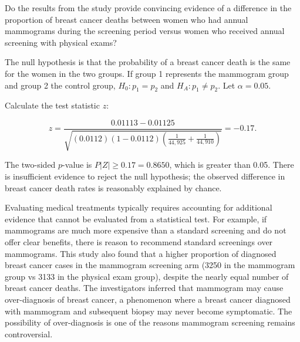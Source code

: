 \begin{example}{Do the results from the study provide convincing evidence of a difference in the proportion of breast cancer deaths between women who had annual mammograms during the screening period versus women who received annual screening with physical exams?}

\label{mammogramExProp}

The null hypothesis is that the probability of a breast cancer death is the same for the women in the two groups. If group 1 represents the mammogram group and group 2 the control group, $H_0: p_1 = p_2$ and $H_A: p_1 \neq p_2$.  Let $\alpha = 0.05$.

Calculate the test statistic $z$:

\[z = \dfrac{0.01113 - 0.01125}{\sqrt{(0.0112)(1-0.0112)\left(\frac{1}{44,925} + \frac{1}{44,910} \right)}} = -0.17.
\]	
	
The two-sided $p$-value is $P|Z| \ge 0.17 = 0.8650$,  which is greater than 0.05. There is insufficient evidence to reject the null hypothesis; the observed difference in breast cancer death rates is reasonably explained by chance. 	

Evaluating medical treatments typically requires accounting for additional evidence that cannot be evaluated from a statistical test. For example, if mammograms are much more expensive than a standard screening and do not offer clear benefits, there is reason to recommend standard screenings over mammograms. This study also found that a higher proportion of diagnosed breast cancer cases in the mammogram screening arm (3250 in the mammogram group vs 3133 in the physical exam group), despite the nearly equal number of breast cancer deaths.  The investigators inferred that mammogram may cause over-diagnosis of breast cancer, a phenomenon where a breast cancer diagnosed with mammogram and subsequent biopsy may never become symptomatic. The possibility of over-diagnosis is one of the reasons mammogram screening remains controversial.

\end{example}

